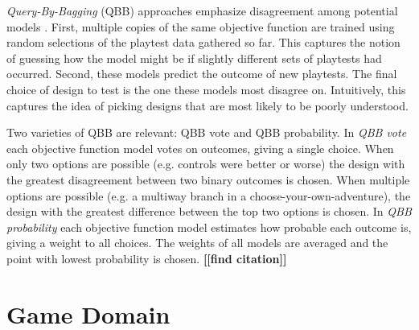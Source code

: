 \documentclass{sig-alternate}
\newcommand{\mytodo}[1]{\textbf{[[#1]]}}
\begin{document}
\textit{Query-By-Bagging} (QBB) approaches emphasize disagreement among potential models \cite{settles2012:al-book}.
First, multiple copies of the same objective function are trained using random selections of the playtest data gathered so far.
This captures the notion of guessing how the model might be if slightly different sets of playtests had occurred.
Second, these models predict the outcome of new playtests.
The final choice of design to test is the one these models most disagree on.
Intuitively, this captures the idea of picking designs that are most likely to be poorly understood.

Two varieties of QBB are relevant: QBB vote and QBB probability.
In \textit{QBB vote} each objective function model votes on outcomes, giving a single choice.
When only two options are possible (e.g. controls were better or worse) the design with the greatest disagreement between two binary outcomes is chosen.
When multiple options are possible (e.g. a multiway branch in a choose-your-own-adventure), the design with the greatest difference between the top two options is chosen.
%
In \textit{QBB probability} each objective function model estimates how probable each outcome is, giving a weight to all choices.
The weights of all models are averaged and the point with lowest probability is chosen. \mytodo{find citation}





\section{Game Domain}
\end{document}
